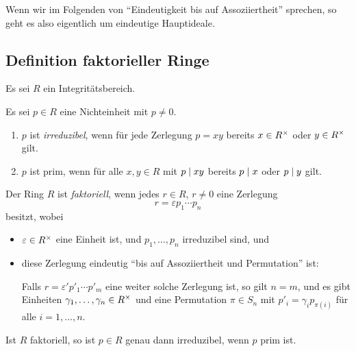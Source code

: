 Wenn wir im Folgenden von \enquote{Eindeutigkeit bis auf Assoziiertheit} sprechen, so geht es also eigentlich um eindeutige Hauptideale.



\subsection{Definition faktorieller Ringe}

Es sei $R$ ein Integritätsbereich.

\begin{definition}
  Es sei $p \in R$ eine Nichteinheit mit $p \neq 0$.
  \begin{enumerate}
    \item
      $p$ ist \emph{irreduzibel}, wenn für jede Zerlegung $p = xy$ bereits $x \in R^{\times}$ oder $y \in R^{\times}$ gilt.
    \item
       $p$ ist prim, wenn für alle $x, y \in R$ mit $p \mathrel{|} xy$ bereits $p \mathrel{|} x$ oder $p \mathrel{|} y$ gilt.
  \end{enumerate}
\end{definition}

\begin{definition}
\label{definition: ufd}
  Der Ring $R$ ist \emph{faktoriell}, wenn jedes $r \in R$, $r \neq 0$ eine Zerlegung
  \begin{equation}
  \label{equation: decomposition into irreducibles}
    r = \varepsilon p_1 \dotsm p_n
  \end{equation}
  besitzt, wobei
  \begin{itemize}
    \item
      $\varepsilon \in R^{\times}$ eine Einheit ist, und $p_1, \dotsc, p_n$ irreduzibel sind, und
    \item
      diese Zerlegung eindeutig \enquote{bis auf Assoziiertheit und Permutation} ist:
      
      Falls $r = \varepsilon' p'_1 \dotsm p'_m$ eine weiter solche Zerlegung ist, so gilt $n = m$, und es gibt Einheiten $\gamma_1, \dotsc, \gamma_n \in R^{\times}$ und eine Permutation $\pi \in S_n$ mit $p'_i = \gamma_i p_{\pi(i)}$ für alle $i = 1, \dotsc, n$.
  \end{itemize}
\end{definition}

\begin{lemma}
  Ist $R$ faktoriell, so ist $p \in R$ genau dann irreduzibel, wenn $p$ prim ist.
\end{lemma}


